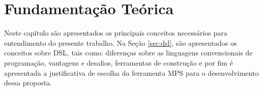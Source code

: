 \chapter{Fundamentação Teórica}
\label{chap:fundamentacao}

Neste capítulo são apresentados os principais conceitos necessários para entendimento do presente trabalho. Na Seção \ref{sec:dsl}, são apresentados os conceitos sobre \gls{DSL}, tais como: diferenças sobre as linguagens convencionais de programação, vantagens e desafios, ferramentas de construção e por fim é apresentada a justificativa de escolha da ferramenta \gls{MPS} para o desenvolvimento dessa proposta.






